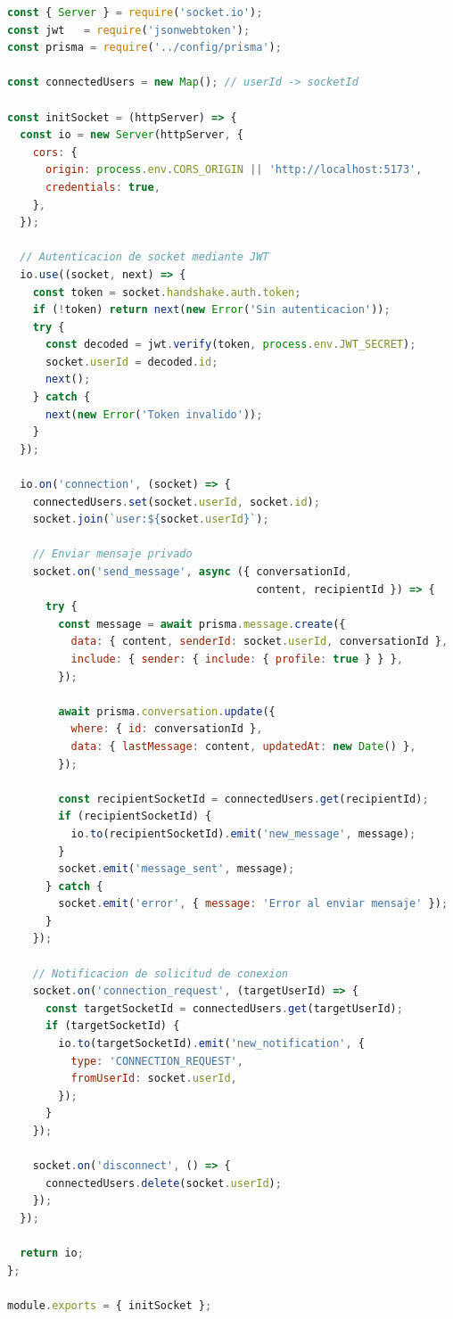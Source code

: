 \documentclass[a4paper]{report}
\begin{document}
\begin{lstlisting}[language=JavaScript,
  caption={src/sockets/messaging.socket.js -- WebSocket de mensajería}]
const { Server } = require('socket.io');
const jwt   = require('jsonwebtoken');
const prisma = require('../config/prisma');

const connectedUsers = new Map(); // userId -> socketId

const initSocket = (httpServer) => {
  const io = new Server(httpServer, {
    cors: {
      origin: process.env.CORS_ORIGIN || 'http://localhost:5173',
      credentials: true,
    },
  });

  // Autenticacion de socket mediante JWT
  io.use((socket, next) => {
    const token = socket.handshake.auth.token;
    if (!token) return next(new Error('Sin autenticacion'));
    try {
      const decoded = jwt.verify(token, process.env.JWT_SECRET);
      socket.userId = decoded.id;
      next();
    } catch {
      next(new Error('Token invalido'));
    }
  });

  io.on('connection', (socket) => {
    connectedUsers.set(socket.userId, socket.id);
    socket.join(`user:${socket.userId}`);

    // Enviar mensaje privado
    socket.on('send_message', async ({ conversationId,
                                       content, recipientId }) => {
      try {
        const message = await prisma.message.create({
          data: { content, senderId: socket.userId, conversationId },
          include: { sender: { include: { profile: true } } },
        });

        await prisma.conversation.update({
          where: { id: conversationId },
          data: { lastMessage: content, updatedAt: new Date() },
        });

        const recipientSocketId = connectedUsers.get(recipientId);
        if (recipientSocketId) {
          io.to(recipientSocketId).emit('new_message', message);
        }
        socket.emit('message_sent', message);
      } catch {
        socket.emit('error', { message: 'Error al enviar mensaje' });
      }
    });

    // Notificacion de solicitud de conexion
    socket.on('connection_request', (targetUserId) => {
      const targetSocketId = connectedUsers.get(targetUserId);
      if (targetSocketId) {
        io.to(targetSocketId).emit('new_notification', {
          type: 'CONNECTION_REQUEST',
          fromUserId: socket.userId,
        });
      }
    });

    socket.on('disconnect', () => {
      connectedUsers.delete(socket.userId);
    });
  });

  return io;
};

module.exports = { initSocket };
\end{lstlisting}
\end{document}
